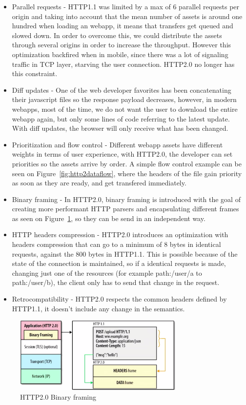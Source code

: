 \begin{itemize}
  \item Parallel requests - HTTP1.1 was limited by a max of 6 parallel requests per origin and taking into account that the mean number of assets is around one hundred when loading an webapp, it means that transfers get queued and slowed down. In order to overcome this, we could distribute the assets through several origins in order to increase the throughput. However this optimization backfired when in mobile, since there was a lot of signaling traffic in TCP layer, starving the user connection. HTTP2.0 no longer has this constraint.
  \item Diff updates - One of the web developer favorites has been concatenating their javascript files so the response payload decreases, however, in modern webapps, most of the time, we do not want the user to download the entire webapp again, but only some lines of code referring to the latest update. With diff updates, the browser will only receive what has been changed.
  \item Prioritization and flow control - Different webapp assets have different weights in terms of user experience, with HTTP2.0, the developer can set priorities so the assets arrive by order.  A simple flow control example can be seen on Figure~\ref{fig:http2dataflow}, where the headers of the file gain priority as soon as they are ready, and get transfered immediately. 
  \item Binary framing - In HTTP2.0, binary framing is introduced with the goal of creating more performant HTTP parsers and encapsulating different frames as seen on Figure~\ref{fig:binaryframing}, so they can be send in an independent way.
  \item HTTP headers compression - HTTP2.0 introduces an optimization with headers compression\cite{Ruellan2013} that can go to a minimum of 8 bytes in identical requests, against the 800 bytes in HTTP1.1. This is possible because of the state of the connection is maintained, so if a identical requests is made, changing just one of the resources (for example path:/user/a to path:/user/b), the client only has to send that change in the request.
  \item Retrocompatibility - HTTP2.0 respects the common headers defined by HTTP1.1, it doesn't include any change in the semantics.
\end{itemize}

\begin{figure}[htbp]
  \centering
  \includegraphics[width=0.75\textwidth]{img/http2binaryframing.png}
  \caption{HTTP2.0 Binary framing}
  \label{fig:binaryframing}
\end{figure}

